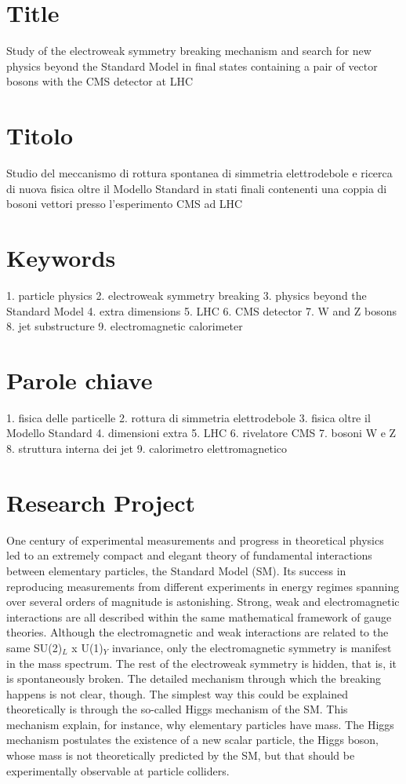 \documentclass[10pt, a4paper]{article}
\begin{document}
\reversemarginpar

\section*{Title}
Study of the electroweak symmetry breaking mechanism and search 
for new physics beyond the Standard Model in final states containing a pair of 
vector bosons with the CMS detector at LHC

\section*{Titolo}
Studio del meccanismo di rottura spontanea di simmetria elettrodebole e
ricerca di nuova fisica oltre il Modello Standard in stati finali contenenti una coppia
di bosoni vettori presso l'esperimento CMS ad LHC

\section*{Keywords}
1. particle physics
2. electroweak symmetry breaking
3. physics beyond the Standard Model
4. extra dimensions
5. LHC
6. CMS detector
7. W and Z bosons
8. jet substructure
9. electromagnetic calorimeter

\section*{Parole chiave}
1. fisica delle particelle
2. rottura di simmetria elettrodebole
3. fisica oltre il Modello Standard
4. dimensioni extra
5. LHC
6. rivelatore CMS
7. bosoni W e Z
8. struttura interna dei jet
9. calorimetro elettromagnetico


\section*{Research Project}

One century of experimental measurements and progress in theoretical physics 
led to an extremely compact and elegant theory of fundamental interactions between 
elementary particles, the Standard Model (SM). Its success in reproducing 
measurements from different experiments in energy regimes spanning 
over several orders of magnitude is astonishing. 
Strong, weak and electromagnetic interactions are all described within the 
same mathematical framework of gauge theories. Although the electromagnetic and weak 
interactions are related to the same SU(2)$_L$ x U(1)$_Y$ invariance, only 
the electromagnetic symmetry is manifest in the mass spectrum. 
The rest of the electroweak symmetry is hidden, that is, it is spontaneously broken. 
The detailed mechanism through which the breaking happens is not clear, though. 
The simplest way this could be explained theoretically is through the 
so-called Higgs mechanism of the SM. This mechanism explain, for instance, why 
elementary particles have mass. The Higgs mechanism postulates the existence 
of a new scalar particle, the Higgs boson, whose mass is not theoretically predicted by 
the SM, but that should be experimentally observable at particle colliders. \\
\end{document}
